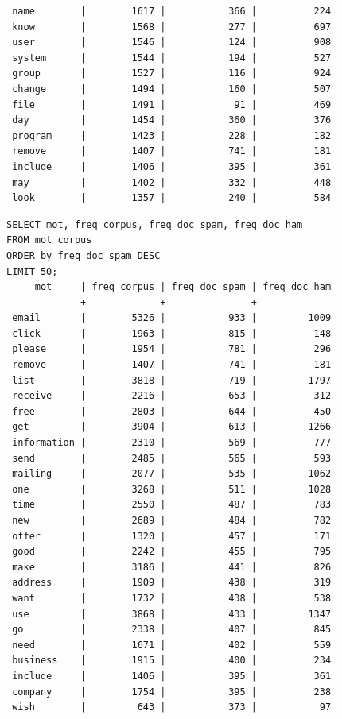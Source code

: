 \documentclass[a4paper,12pt]{article}
\begin{document}
\begin{verbatim}
 name        |        1617 |           366 |          224
 know        |        1568 |           277 |          697
 user        |        1546 |           124 |          908
 system      |        1544 |           194 |          527
 group       |        1527 |           116 |          924
 change      |        1494 |           160 |          507
 file        |        1491 |            91 |          469
 day         |        1454 |           360 |          376
 program     |        1423 |           228 |          182
 remove      |        1407 |           741 |          181
 include     |        1406 |           395 |          361
 may         |        1402 |           332 |          448
 look        |        1357 |           240 |          584
	\end{verbatim}

	\begin{verbatim}
SELECT mot, freq_corpus, freq_doc_spam, freq_doc_ham 
FROM mot_corpus
ORDER by freq_doc_spam DESC
LIMIT 50;
     mot     | freq_corpus | freq_doc_spam | freq_doc_ham 
-------------+-------------+---------------+--------------
 email       |        5326 |           933 |         1009
 click       |        1963 |           815 |          148
 please      |        1954 |           781 |          296
 remove      |        1407 |           741 |          181
 list        |        3818 |           719 |         1797
 receive     |        2216 |           653 |          312
 free        |        2803 |           644 |          450
 get         |        3904 |           613 |         1266
 information |        2310 |           569 |          777
 send        |        2485 |           565 |          593
 mailing     |        2077 |           535 |         1062
 one         |        3268 |           511 |         1028
 time        |        2550 |           487 |          783
 new         |        2689 |           484 |          782
 offer       |        1320 |           457 |          171
 good        |        2242 |           455 |          795
 make        |        3186 |           441 |          826
 address     |        1909 |           438 |          319
 want        |        1732 |           438 |          538
 use         |        3868 |           433 |         1347
 go          |        2338 |           407 |          845
 need        |        1671 |           402 |          559
 business    |        1915 |           400 |          234
 include     |        1406 |           395 |          361
 company     |        1754 |           395 |          238
 wish        |         643 |           373 |           97

\end{verbatim}
\end{document}
